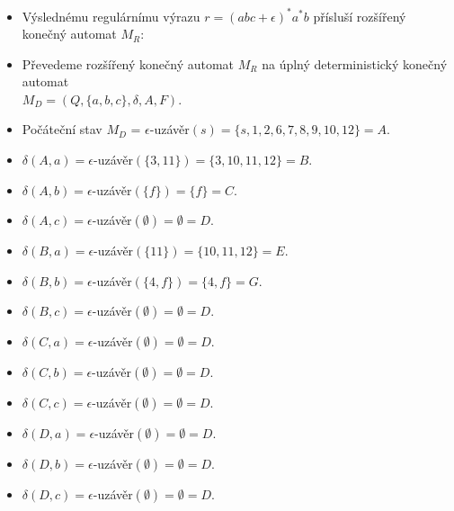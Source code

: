 \documentclass[a4paper,11pt]{article}[24.3.2010]
\begin{document}
\begin{enumerate}
\begin{enumerate}
\begin{itemize}
        \item Výslednému regulárnímu výrazu  $r=(abc+\epsilon)^*a^*b$ přísluší rozšířený konečný automat $M_{R}$:
        \begin{figure}[h!]
        \begin{center}
        \end{center}
        \end{figure}
\newpage
        \item Převedeme rozšířený konečný automat $M_{R}$ na úplný deterministický konečný automat\\ $M_{D} = (Q,\{a,b,c\},\delta,A,F)$.\\
        \item Počáteční stav $M_{D}$ = $\epsilon$-uzávěr$(s)=\{s,1,2,6,7,8,9,10,12\} = A$.
        \item $\delta(A,a)=\epsilon$-uzávěr$(\{3,11\})=\{3,10,11,12\}=B$.
        \item $\delta(A,b)=\epsilon$-uzávěr$(\{f\})=\{f\}=C$.
        \item $\delta(A,c)=\epsilon$-uzávěr$(\emptyset)=\emptyset=D$.
        \item $\delta(B,a)=\epsilon$-uzávěr$(\{11\})=\{10,11,12\}=E$.
        \item $\delta(B,b)=\epsilon$-uzávěr$(\{4,f\})=\{4,f\}=G$.
        \item $\delta(B,c)=\epsilon$-uzávěr$(\emptyset)=\emptyset=D$.
        \item $\delta(C,a)=\epsilon$-uzávěr$(\emptyset)=\emptyset=D$.
        \item $\delta(C,b)=\epsilon$-uzávěr$(\emptyset)=\emptyset=D$.
        \item $\delta(C,c)=\epsilon$-uzávěr$(\emptyset)=\emptyset=D$.
        \item $\delta(D,a)=\epsilon$-uzávěr$(\emptyset)=\emptyset=D$.
        \item $\delta(D,b)=\epsilon$-uzávěr$(\emptyset)=\emptyset=D$.
        \item $\delta(D,c)=\epsilon$-uzávěr$(\emptyset)=\emptyset=D$.

\end{itemize}
\end{enumerate}
\end{enumerate}
\end{document}
